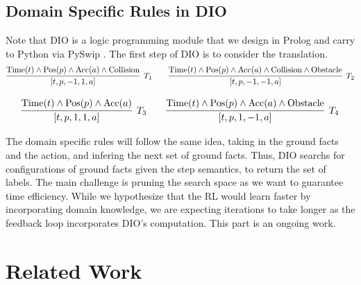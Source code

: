 \documentclass[a4paper,11pt]{article}
\theoremstyle{definition}
\begin{document}
\subsection{Domain Specific Rules in DIO}

Note that DIO is a logic programming module that we design in Prolog and 
carry to Python via PySwip \cite{tekol2020}.
The first step of DIO is to consider the translation. 
\[
  \infer[T_1]{[t, p, -1, 1, a]}{\text{Time}(t) \wedge \text{Pos}(p) 
                                \wedge \text{Acc}(a) \wedge
                              \text{Collision}}
   \qquad
   \infer[T_2]{[t, p, -1, -1, a]}{\text{Time}(t) \wedge \text{Pos}(p) 
                                  \wedge \text{Acc}(a) \wedge
                                  \text{Collision} \wedge \text{Obstacle}}
\]

\[
  \infer[T_3]{[t, p, 1, 1, a]}{\text{Time}(t) \wedge \text{Pos}(p) 
                                \wedge \text{Acc}(a)
                            }
   \qquad
   \infer[T_4]{[t, p, 1, -1, a]}{\text{Time}(t) \wedge \text{Pos}(p) 
                                  \wedge \text{Acc}(a) \wedge \text{Obstacle}}
\]

The domain specific rules will follow the same idea, taking in the ground facts and the action, 
and infering the next set of ground facts. Thus, DIO searchs for configurations of ground facts given the step semantics, 
to return the set of labels. The main challenge is pruning the search space as we want to 
guarantee time efficiency. While we hypothesize that the RL would learn faster by incorporating 
domain knowledge, we are expecting iterations to take longer as the feedback loop incorporates DIO's computation. This part is an ongoing work. 

\section{Related Work}
\end{document}
